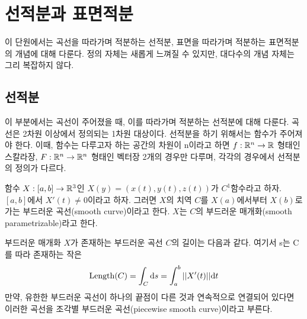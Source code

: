 \section{선적분과 표면적분}
이 단원에서는 곡선을 따라가며 적분하는 선적분, 표면을 따라가며 적분하는 표면적분의 개념에 대해 다룬다. 정의 자체는 새롭게 느껴질 수 있지만, 대다수의 개념 자체는 그리 복잡하지 않다.

\subsection{선적분}
이 부분에서는 곡선이 주어졌을 때, 이를 따라가며 적분하는 선적분에 대해 다룬다. 곡선은 2차원 이상에서 정의되는 1차원 대상이다. 선적분을 하기 위해서는 함수가 주어져야 한다. 이때, 함수는 다루고자 하는 공간의 차원이 n이라고 하면 $f:\mathbb{R}^n\to\mathbb{R}$ 형태인 스칼라장, $F:\mathbb{R}^n\to\mathbb{R}^n$ 형태인 벡터장 2개의 경우만 다루며, 각각의 경우에서 선적분의 정의가 다르다.
\begin{definition}[부드러운 곡선]
함수 $X:[a,b]\to\mathbb{R}^3$인 $X(y)=(x(t),y(t),z(t))$가 $C^1$함수라고 하자. $[a,b]$에서 $X'(t)\neq 0$이라고 하자. 그러면 $X$의 치역 $C$를 $X(a)$에서부터 $X(b)$로 가는 부드러운 곡선(smooth curve)이라고 한다. $X$는 $C$의 부드러운 매개화(smooth parametrizable)라고 한다.
\end{definition}
부드러운 매개화 $X$가 존재하는 부드러운 곡선 $C$의 길이는 다음과 같다. 여기서 s는 C를 따라 존재하는 작은 
$$
\mathrm{Length}(C)=\int_C\dd s=\int_a^b||X'(t)||\dd t
$$
만약, 유한한 부드러운 곡선이 하나의 끝점이 다른 것과 연속적으로 연결되어 있다면 이러한 곡선을 조각별 부드러운 곡선(piecewise smooth curve)이라고 부른다.


